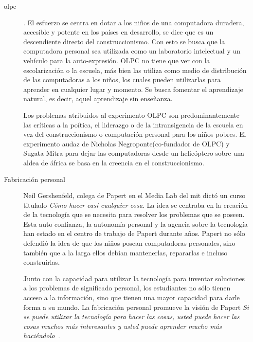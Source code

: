 \begin{description}


\item[\Gls{olpc}]. El esfuerzo se centra en dotar a los niños de una computadora
	duradera, accesible y potente en los países en desarrollo, se dice que
	es un descendiente directo del construccionismo. Con esto se busca que
	la computadora personal sea utilizada como un laboratorio intelectual y
	un vehículo para la auto-expresión. OLPC no tiene que ver con la
	escolarización o la escuela, más bien las utiliza como medio de
	distribución de las computadoras a los niños, los cuales pueden
	utilizarlas para aprender en cualquier lugar y momento. Se busca
	fomentar el aprendizaje natural, es decir, aquel aprendizaje sin
	enseñanza.

	Los problemas atribuidos al experimento OLPC son predominantemente las 
	críticas a la poítica, el liderazgo	o de la intransigencia de la escuela
	en vez del construccionismo o computación personal para los niños pobres.
	El experimento audaz de Nicholas Negroponte(co-fundador de OLPC) y Sugata Mitra
	para dejar las computadoras desde un helicóptero sobre una aldea de áfrica
	se basa en la creencia en el construccionismo\cite{papertian:const}.

\item[Fabricación personal] Neil Gershenfeld, colega de Papert en el Media Lab
	del \Gls{mit} dictó un curso titulado \emph{Cómo hacer casi cualquier
	cosa}. La idea se centraba en la creación de  la tecnología que se
	necesita para resolver los problemas que se poseen. Esta auto-confianza, la
	autonomía personal y la agencia sobre la tecnología han estado en el centro de
	trabajo de Papert durante años. Papert no sólo defendió la idea de que los niños
	posean computadoras personales, sino también que a la larga ellos debían mantenerlas,
	repararlas e incluso construirlas.

	Junto con la capacidad para utilizar la tecnología para inventar soluciones
	a los problemas de significado personal, los estudiantes no sólo tienen acceso 
	a la información, sino que tienen una mayor capacidad para darle forma a su mundo. La
	fabricación personal promueve la visión de Papert \emph{Si se puede utilizar la
	tecnología para hacer las cosas, usted puede hacer las cosas muchos más interesantes y
	usted puede aprender mucho más haciéndolo}~\cite{papertian:const}.

\end{description}

